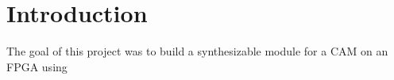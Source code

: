 \section{Introduction}
The goal of this project was to build a synthesizable module for a CAM on an FPGA using 